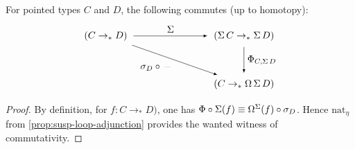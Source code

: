 \documentclass[english,a4]{article}
\newcommand{\nat}{\mathrm{nat}}
\newcommand{\ptdto}{\to_\ast}%
\begin{document}
\begin{lemma} \label{lem:adj-prop}
    For pointed types $C$ and $D$, the following commutes (up to homotopy):
    \begin{equation}
    \begin{tikzpicture}[x=5cm,y=-1.75cm,baseline=(current bounding box.center)]
    \tikzset{arrow/.style={shorten >=0.1cm,shorten <=.1cm,-latex}}
    \node (A) at (0,0) {$(C \to_* D)$}; 
    \node (D) at (1,0) {$(\susp C \to_* \susp D)$}; 
    \node (C) at (1,1) {$(C \to_* \Omega \susp D)$}; 
    
    \draw[arrow] (A) to node [above] {$\susp$} (D);
    \draw[arrow] (A) to node [below left] {$\sigma_D \circ \, \blank$} (C);
    \draw[arrow] (D) to node [right] {$\Phi_{C,\susp D}$} (C);
    \end{tikzpicture}
    \end{equation}
\end{lemma}
\begin{proof}
  By definition, for $f:C\ptdto D)$, one has $\Phi \circ \operatorname{\Sigma} (f) \equiv
  \mathop{\Omega^{\operatorname{\Sigma}}}(f)\circ \sigma_D$. Hence $\nat_\eta$ from
  \cref{prop:susp-loop-adjunction} provides the wanted witness of
  commutativity. 
\end{proof}
\end{document}
